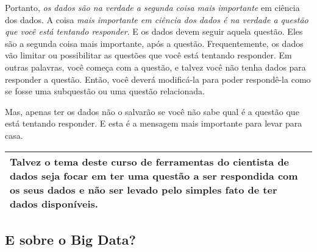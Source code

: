 \begin{multicols}{2}
\begin{footnotesize}
Portanto, \emph{os dados são na verdade a segunda coisa mais importante} em ciência dos dados. A coisa \emph{mais importante em ciência dos dados é na verdade a questão que você está tentando responder}. E os dados devem seguir aquela questão. Eles são a segunda coisa mais importante, após a questão. Frequentemente, os dados vão limitar ou possibilitar as questões que você está tentando responder. Em outras palavras, você começa com a questão, e talvez você não tenha dados para responder a questão. Então, você deverá modificá-la para poder respondê-la como se fosse uma subquestão ou uma questão relacionada. 

Mas, apenas ter os dados não o salvarão se você não sabe qual é a questão que está tentando responder. E esta é a mensagem mais importante para levar para casa.
\end{footnotesize}
\end{multicols}

\begin{center}
\begin{tabular}{p{15cm}}
\hline
Talvez o tema deste curso de ferramentas do cientista de dados seja focar em ter uma questão a ser respondida com os seus dados e não ser levado pelo simples fato de ter dados disponíveis. \\
\hline
\end{tabular}
\end{center}


\subsection{E sobre o Big Data?}

